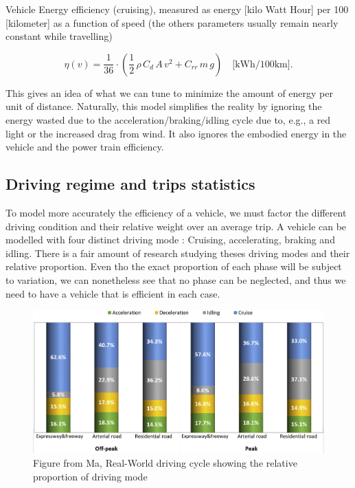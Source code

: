 Vehicle Energy efficiency (cruising), measured as energy [kilo Watt Hour] per 100 [kilometer] as a function of speed (the others parameters usually remain nearly constant while travelling)

\begin{equation}
\eta(v) = \frac{1}{36}\cdot\left( \frac{1}{2}\,\rho\,C_d\,A\,v^2 + C_{rr}\,m\,g\right) \quad \text{[kWh/100km]}.
\label{eq:energy_consumption}
\end{equation}


This gives an idea of what we can tune to minimize the amount of energy per unit of distance. Naturally, this model simplifies the reality by ignoring the energy wasted due to the acceleration/braking/idling cycle due to, e.g., a red light or the increased drag from wind. It also ignores the embodied energy in the vehicle and the power train efficiency.

\subsection{Driving regime and trips statistics}

To model more accurately the efficiency of a vehicle, we must factor the different driving condition and their relative weight over an average trip. A vehicle can be modelled with four distinct driving mode : Cruising, accelerating, braking and idling. There is a fair amount of research studying theses driving modes and their relative proportion. Even tho the exact proportion of each phase will be subject to variation, we can nonetheless see that no phase can be neglected, and thus we need to have a vehicle that is efficient in each case.

\begin{figure}[h!]
    \centering
    \includegraphics[width=0.8\linewidth]{Figures/ch2_shareOfDrivingModeChina.jpg}
    \caption{Figure from Ma, Real-World driving cycle\cite{ma_real-world_2019} showing the relative proportion of driving mode}
    \label{fig:ch2proportiondrivingmode}
\end{figure}


